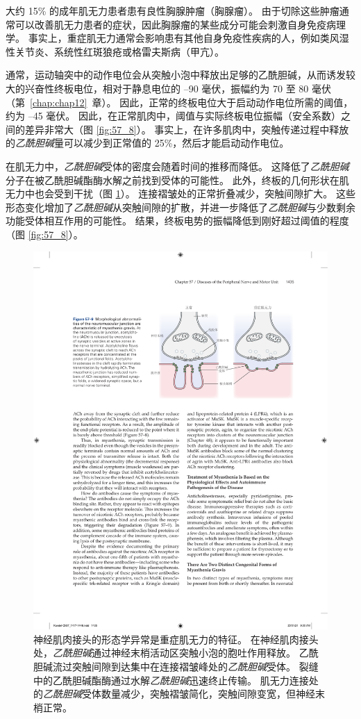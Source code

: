 大约 15\% 的成年肌无力患者患有良性胸腺肿瘤（胸腺瘤）。
由于切除这些肿瘤通常可以改善肌无力患者的症状，因此胸腺瘤的某些成分可能会刺激自身免疫病理学。
事实上，重症肌无力通常会影响患有其他自身免疫性疾病的人，例如类风湿性关节炎、系统性红斑狼疮或格雷夫斯病（甲亢）。


通常，运动轴突中的动作电位会从突触小泡中释放出足够的乙酰胆碱，从而诱发较大的兴奋性终板电位，相对于静息电位的 –90 毫伏，振幅约为 70 至 80 毫伏（第~\ref{chap:chap12}~章）。
因此，正常的终板电位大于启动动作电位所需的阈值，约为 –45 毫伏。
因此，在正常肌肉中，阈值与实际终板电位振幅（安全系数）之间的差异非常大（图 \ref{fig:57_8}）。
事实上，在许多肌肉中，突触传递过程中释放的\textit{乙酰胆碱}量可以减少到正常值的 25\%，然后才能启动动作电位。


在肌无力中，\textit{乙酰胆碱}受体的密度会随着时间的推移而降低。
这降低了\textit{乙酰胆碱}分子在被乙酰胆碱酯酶水解之前找到受体的可能性。
此外，终板的几何形状在肌无力中也会受到干扰（图 \ref{fig:57_9}）。
连接褶皱处的正常折叠减少，突触间隙扩大。
这些形态变化增加了\textit{乙酰胆碱}从突触间隙的扩散，并进一步降低了\textit{乙酰胆碱}与少数剩余功能受体相互作用的可能性。
结果，终板电势的振幅降低到刚好超过阈值的程度（图 \ref{fig:57_8}）。


\begin{figure}[htbp]
	\centering
	\includegraphics[width=0.79\linewidth]{chap57/fig_57_9}
	\caption{神经肌肉接头的形态学异常是重症肌无力的特征。
		在神经肌肉接头处，\textit{乙酰胆碱}通过神经末梢活动区突触小泡的胞吐作用释放。
		乙酰胆碱流过突触间隙到达集中在连接褶皱峰处的\textit{乙酰胆碱}受体。
		裂缝中的乙酰胆碱酯酶通过水解\textit{乙酰胆碱}迅速终止传输。
		肌无力连接处的\textit{乙酰胆碱}受体数量减少，突触褶皱简化，突触间隙变宽，但神经末梢正常。}
	\label{fig:57_9}
\end{figure}


